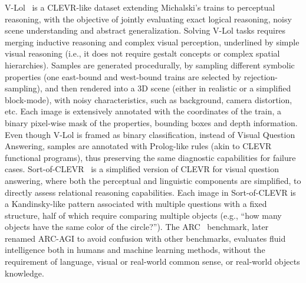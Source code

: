V-Lol~\cite{helff2023v} is a CLEVR-like dataset extending Michalski's trains to perceptual reasoning, with the objective of jointly evaluating exact logical reasoning, noisy scene understanding and abstract generalization.
Solving V-Lol tasks requires merging inductive reasoning and complex visual perception, underlined by simple visual reasoning (i.e., it does not require gestalt concepts or complex spatial hierarchies).
Samples are generated procedurally, by sampling different symbolic properties (one east-bound and west-bound trains are selected by rejection-sampling), and then rendered into a 3D scene (either in realistic or a simplified block-mode), with noisy characteristics, such as background, camera distortion, etc.
Each image is extensively annotated with the coordinates of the train, a binary pixel-wise mask of the properties, bounding boxes and depth information.
Even though V-Lol is framed as binary classification, instead of Visual Question Answering, samples are annotated with Prolog-like rules (akin to CLEVR functional programs), thus preserving the same diagnostic capabilities for failure cases.
Sort-of-CLEVR~\cite{santoro2017simple} is a simplified version of CLEVR for visual question answering, where both the perceptual and linguistic components are simplified, to directly assess relational reasoning capabilities. Each image in Sort-of-CLEVR is a Kandinsky-like pattern associated with multiple questions with a fixed structure, half of which require comparing multiple objects (e.g., ``how many objects have the same color of the circle?''). %
%
%		
%		
%       
%		
%
The ARC~\cite{chollet2019measure} benchmark, later renamed ARC-AGI to avoid confusion with other benchmarks, evaluates fluid intelligence both in humans and machine learning methods, without the requirement of language, visual or real-world common sense, or real-world objects knowledge.
